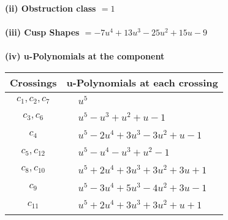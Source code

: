 \documentclass[1p]{elsarticle_modified}
\theoremstyle{definition}
\begin{document}
\flushleft \textbf{(ii) Obstruction class $= 1$}\\~\\
\flushleft \textbf{(iii) Cusp Shapes $= -7 u^4+13 u^3-25 u^2+15 u-9$}\\~\\
\newpage\renewcommand{\arraystretch}{1}
\flushleft \textbf{(iv) u-Polynomials at the component}\newline \\
\begin{tabular}{m{50pt}|m{274pt}}
Crossings & \hspace{64pt}u-Polynomials at each crossing \\
\hline $$\begin{aligned}c_{1},c_{2},c_{7}\end{aligned}$$&$\begin{aligned}
&u^5
\end{aligned}$\\
\hline $$\begin{aligned}c_{3},c_{6}\end{aligned}$$&$\begin{aligned}
&u^5- u^3+u^2+u-1
\end{aligned}$\\
\hline $$\begin{aligned}c_{4}\end{aligned}$$&$\begin{aligned}
&u^5-2 u^4+3 u^3-3 u^2+u-1
\end{aligned}$\\
\hline $$\begin{aligned}c_{5},c_{12}\end{aligned}$$&$\begin{aligned}
&u^5- u^4- u^3+u^2-1
\end{aligned}$\\
\hline $$\begin{aligned}c_{8},c_{10}\end{aligned}$$&$\begin{aligned}
&u^5+2 u^4+3 u^3+3 u^2+3 u+1
\end{aligned}$\\
\hline $$\begin{aligned}c_{9}\end{aligned}$$&$\begin{aligned}
&u^5-3 u^4+5 u^3-4 u^2+3 u-1
\end{aligned}$\\
\hline $$\begin{aligned}c_{11}\end{aligned}$$&$\begin{aligned}
&u^5+2 u^4+3 u^3+3 u^2+u+1
\end{aligned}$\\
\hline
\end{tabular}\\~\\
\end{document}
